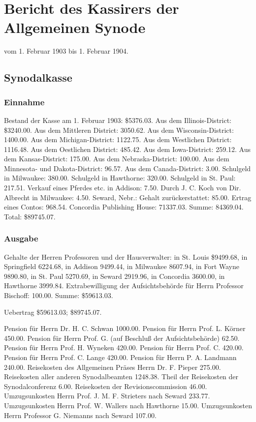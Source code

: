 \chapter[Bericht des Kassirers der …]{Bericht des Kassirers der Allgemeinen Synode}

vom 1. Februar 1903 bis 1. Februar 1904.

\section{Synodalkasse}

\subsection{Einnahme}

Bestand der Kasse am 1. Februar 1903: \$5376.03. Aus dem Illinois-District: \$3240.00. Aus dem Mittleren District: 3050.62. Aus dem Wisconsin-District: 1400.00. Aus dem Michigan-District: 1122.75. Aus dem Westlichen District: 1116.48. Aus dem Oestlichen District: 485.42. Aus dem Iowa-District: 259.12. Aus dem Kansas-District: 175.00. Aus dem Nebraska-District: 100.00. Aus dem Minnesota- und Dakota-District: 96.57. Aus dem Canada-District: 3.00. Schulgeld in Milwaukee: 380.00. Schulgeld in Hawthorne: 320.00. Schulgeld in St. Paul: 217.51. Verkauf eines Pferdes etc. in Addison: 7.50. Durch J. C. Koch von Dir. Albrecht in Milwaukee: 4.50. Seward, Nebr.: Gehalt zurückerstattet: 85.00. Ertrag eines Contos: 968.54. Concordia Publishing House: 71337.03. Summe: 84369.04. Total: \$89745.07.

\subsection{Ausgabe}

Gehalte der Herren Professoren und der Hausverwalter: in St. Louis \$9499.68, in Springfield 6224.68, in Addison 9499.44, in Milwaukee 8607.94, in Fort Wayne 9890.80, in St. Paul 5270.69, in Seward 2919.96, in Concordia 3600.00, in Hawthorne 3999.84. Extrabewilligung der Aufsichtsbehörde für Herrn Professor Bischoff: 100.00. Summe: \$59613.03.


Uebertrag \$59613.03; \$89745.07.

Pension für Herrn Dr. H. C. Schwan 1000.00. Pension für Herrn Prof. L. Körner 450.00. Pension für Herrn Prof. G.  (auf Beschluß der Aufsichtsbehörde) 62.50. Pension für Herrn Prof. H. Wyneken 420.00. Pension für Herrn Prof. C.  420.00. Pension für Herrn Prof. C. Lange 420.00. Pension für Herrn P. A. Landmann 240.00. Reisekosten des Allgemeinen Präses Herrn Dr. F. Pieper 275.00. Reisekosten aller anderen Synodalbeamten 1248.38. Theil der Reisekosten der Synodalconferenz 6.00. Reisekosten der Revisionscommission 46.00. Umzugsunkosten Herrn Prof. J. M. F. Strieters nach Seward 233.77. Umzugsunkosten Herrn Prof. W. Wallers nach Hawthorne 15.00. Umzugsunkosten Herrn Professor G. Niemanns nach Seward 107.00.

